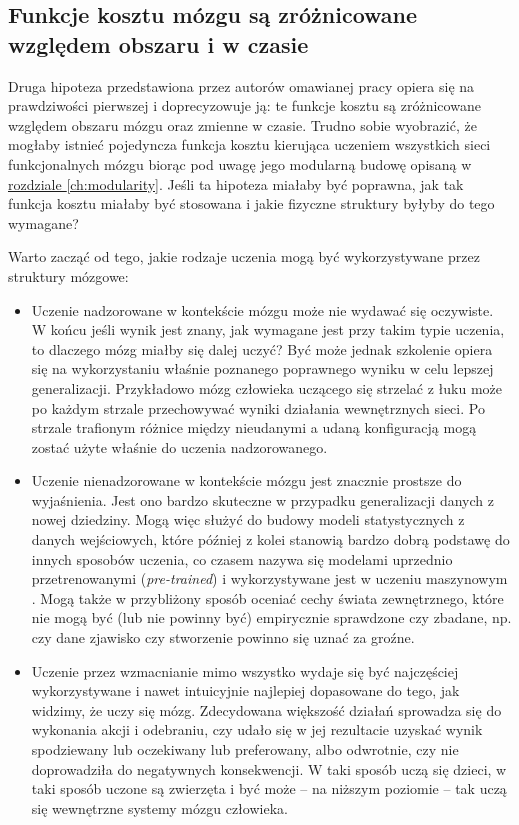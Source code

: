 \subsection{Funkcje kosztu mózgu są zróżnicowane względem obszaru i w czasie}
\label{subsec:cost-function-is-diverse}

Druga hipoteza przedstawiona przez autorów omawianej pracy \cite{marblestone2016toward} opiera się na prawdziwości pierwszej i doprecyzowuje ją: te funkcje kosztu są zróżnicowane względem obszaru mózgu oraz zmienne w czasie.
Trudno sobie wyobrazić, że mogłaby istnieć pojedyncza funkcja kosztu kierująca uczeniem wszystkich sieci funkcjonalnych mózgu biorąc pod uwagę jego modularną budowę opisaną w \hyperref[ch:modularity]{rozdziale \ref*{ch:modularity}}.
Jeśli  ta hipoteza miałaby być poprawna, jak tak funkcja kosztu miałaby być stosowana i jakie fizyczne struktury byłyby do tego wymagane?

Warto zacząć od tego, jakie rodzaje uczenia mogą być wykorzystywane przez struktury mózgowe:

\begin{itemize}
	\item Uczenie nadzorowane w kontekście mózgu może nie wydawać się oczywiste.
	W końcu jeśli wynik jest znany, jak wymagane jest przy takim typie uczenia, to dlaczego mózg miałby się dalej uczyć?
	Być może jednak szkolenie opiera się na wykorzystaniu właśnie poznanego poprawnego wyniku w celu lepszej generalizacji.
	Przykładowo mózg człowieka uczącego się strzelać z łuku może po każdym strzale przechowywać wyniki działania wewnętrznych sieci.
	Po strzale trafionym różnice między nieudanymi a udaną konfiguracją mogą zostać użyte właśnie do uczenia nadzorowanego.
	\item Uczenie nienadzorowane w kontekście mózgu jest znacznie prostsze do wyjaśnienia.
	Jest ono bardzo skuteczne w przypadku generalizacji danych z nowej dziedziny.
	Mogą więc służyć do budowy modeli statystycznych z danych wejściowych, które później z kolei stanowią bardzo dobrą podstawę do innych sposobów uczenia, co czasem nazywa się modelami uprzednio przetrenowanymi (\emph{pre-trained}) i wykorzystywane jest w uczeniu maszynowym \cite{erhan2009difficulty}.
	Mogą także w przybliżony sposób oceniać cechy świata zewnętrznego, które nie mogą być (lub nie powinny być) empirycznie sprawdzone czy zbadane, np. czy dane zjawisko czy stworzenie powinno się uznać za groźne.
	\item Uczenie przez wzmacnianie mimo wszystko wydaje się być najczęściej wykorzystywane i nawet intuicyjnie najlepiej dopasowane do tego, jak widzimy, że uczy się mózg.
	Zdecydowana większość działań sprowadza się do wykonania akcji i odebraniu, czy udało się w jej rezultacie uzyskać wynik spodziewany lub oczekiwany lub preferowany, albo odwrotnie, czy nie doprowadziła do negatywnych konsekwencji.
	W taki sposób uczą się dzieci, w taki sposób uczone są zwierzęta i być może -- na niższym poziomie -- tak uczą się wewnętrzne systemy mózgu człowieka.
\end{itemize}

